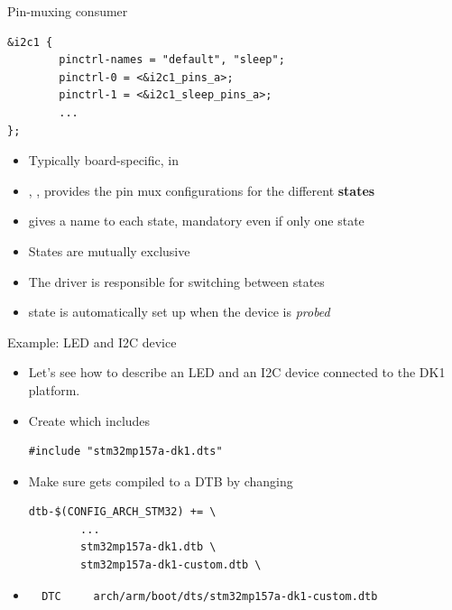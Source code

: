 \begin{frame}[fragile]{Pin-muxing consumer}
  \begin{block}{}
{\tiny
\begin{verbatim}
&i2c1 {
        pinctrl-names = "default", "sleep";
        pinctrl-0 = <&i2c1_pins_a>;
        pinctrl-1 = <&i2c1_sleep_pins_a>;
        ...
};
\end{verbatim}
}
\end{block}
\begin{itemize}
\item Typically board-specific, in 
\item {}, ,  provides
  the pin mux configurations for the different {\bf states}
\item {} gives a name to each state, mandatory even
  if only one state
\item States are mutually exclusive
\item The driver is responsible for switching between states
\item {} state is automatically set up when the device is
  {\em probed}
\end{itemize}
\end{frame}

\begin{frame}[fragile]{Example: LED and I2C device}
  \begin{itemize}
  \item Let's see how to describe an LED and an I2C device connected
    to the DK1 platform.
  \item Create 
    which includes 
    \begin{block}{}
{\tiny
\begin{verbatim}
#include "stm32mp157a-dk1.dts"
\end{verbatim}
}
    \end{block}
  \item Make sure  gets compiled to a
    DTB by changing 
    \begin{block}{}
      {\tiny
\begin{verbatim}
dtb-$(CONFIG_ARCH_STM32) += \
        ...
        stm32mp157a-dk1.dtb \
        stm32mp157a-dk1-custom.dtb \
\end{verbatim}
      }
    \end{block}
  \item {}
    \begin{block}{}
      {\tiny
\begin{verbatim}
  DTC     arch/arm/boot/dts/stm32mp157a-dk1-custom.dtb
\end{verbatim}
      }
    \end{block}
  \end{itemize}
\end{frame}

